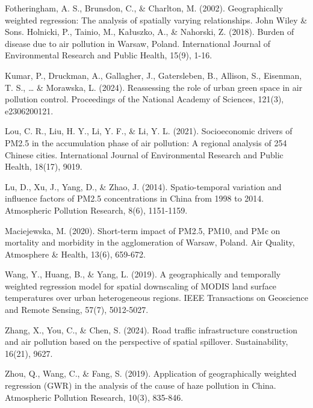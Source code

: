 \documentclass[
  11pt,
]{article}
\begin{document}
Fotheringham, A. S., Brunsdon, C., \& Charlton, M. (2002).
Geographically weighted regression: The analysis of spatially varying
relationships. John Wiley \& Sons. Holnicki, P., Tainio, M., Kałuszko,
A., \& Nahorski, Z. (2018). Burden of disease due to air pollution in
Warsaw, Poland. International Journal of Environmental Research and
Public Health, 15(9), 1-16.

Kumar, P., Druckman, A., Gallagher, J., Gatersleben, B., Allison, S.,
Eisenman, T. S., \ldots{} \& Morawska, L. (2024). Reassessing the role
of urban green space in air pollution control. Proceedings of the
National Academy of Sciences, 121(3), e2306200121.

Lou, C. R., Liu, H. Y., Li, Y. F., \& Li, Y. L. (2021). Socioeconomic
drivers of PM2.5 in the accumulation phase of air pollution: A regional
analysis of 254 Chinese cities. International Journal of Environmental
Research and Public Health, 18(17), 9019.

Lu, D., Xu, J., Yang, D., \& Zhao, J. (2014). Spatio-temporal variation
and influence factors of PM2.5 concentrations in China from 1998 to
2014. Atmospheric Pollution Research, 8(6), 1151-1159.

Maciejewska, M. (2020). Short-term impact of PM2.5, PM10, and PMc on
mortality and morbidity in the agglomeration of Warsaw, Poland. Air
Quality, Atmosphere \& Health, 13(6), 659-672.

Wang, Y., Huang, B., \& Yang, L. (2019). A geographically and temporally
weighted regression model for spatial downscaling of MODIS land surface
temperatures over urban heterogeneous regions. IEEE Transactions on
Geoscience and Remote Sensing, 57(7), 5012-5027.

Zhang, X., You, C., \& Chen, S. (2024). Road traffic infrastructure
construction and air pollution based on the perspective of spatial
spillover. Sustainability, 16(21), 9627.

Zhou, Q., Wang, C., \& Fang, S. (2019). Application of geographically
weighted regression (GWR) in the analysis of the cause of haze pollution
in China. Atmospheric Pollution Research, 10(3), 835-846.
\end{document}
